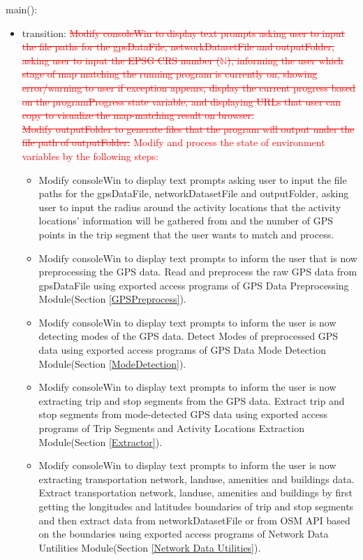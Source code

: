 \documentclass[12pt, titlepage]{article}
\begin{document}
\noindent main():
\begin{itemize}
\item transition: \textcolor{red}{\sout{Modify consoleWin to display text prompts asking user to input the file paths for the gpsDataFile, networkDatasetFile and outputFolder, asking user to input the EPSG CRS number ($\mathbb{N}$), informing the user which stage of map matching the running program is currently on, showing error/warning to user if exception appears, display the current progress based on the programProgress state variable, and displaying URLs that user can copy to visualize the map-matching result on browser.\\
Modify outputFolder to generate files that the program will output under the file path of outputFolder.}\newline
Modify and process the state of environment variables by the following steps:}
\begin{itemize}
    \item Modify consoleWin to display text prompts asking user to input the file paths for the gpsDataFile, networkDatasetFile and outputFolder, asking user to input the radius around the activity locations that the activity locations' information will be gathered from and the number of GPS points in the trip segment that the user wants \progname{} to match and process. 
    
    \item Modify consoleWin to display text prompts to inform the user that \progname{} is now preprocessing the GPS data. Read and preprocess the raw GPS data from gpsDataFile using exported access programs of GPS Data Preprocessing Module(Section \ref{GPSPreprocess}). 
    
    \item Modify consoleWin to display text prompts to inform the user \progname{} is now detecting modes of the GPS data. Detect Modes of preprocessed GPS data using exported access programs of GPS Data Mode Detection Module(Section \ref{ModeDetection}). 

    \item Modify consoleWin to display text prompts to inform the user \progname{} is now extracting trip and stop segments from the GPS data. Extract trip and stop segments from mode-detected GPS data using exported access programs of Trip Segments and Activity Locations Extraction Module(Section \ref{Extractor}).

    \item Modify consoleWin to display text prompts to inform the user \progname{} is now extracting transportation network, landuse, amenities and buildings data. Extract transportation network, landuse, amenities and buildings by first getting the longitudes and latitudes boundaries of trip and stop segments and then extract data from networkDatasetFile or from OSM API based on the boundaries using exported access programs of Network Data Untilities Module(Section \ref{Network Data Utilities}). 


\end{itemize}
\end{itemize}
\end{document}
